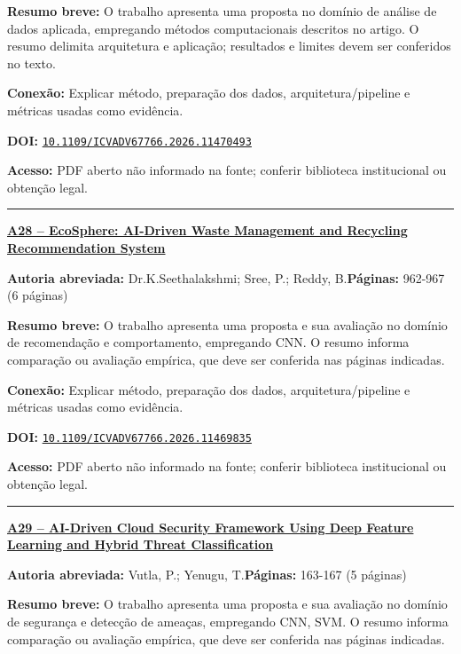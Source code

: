\documentclass[10pt,a4paper]{article}
\begin{document}
\textbf{Resumo breve:} O trabalho apresenta uma proposta no domínio de análise de dados aplicada, empregando métodos computacionais descritos no artigo. O resumo delimita arquitetura e aplicação; resultados e limites devem ser conferidos no texto.\par
\textbf{Conexão:} Explicar método, preparação dos dados, arquitetura/pipeline e métricas usadas como evidência.\par
\textbf{DOI:} \href{https://doi.org/10.1109/ICVADV67766.2026.11470493}{\nolinkurl{10.1109/ICVADV67766.2026.11470493}}\par
\textbf{Acesso:} PDF aberto não informado na fonte; conferir biblioteca institucional ou obtenção legal.\par
\noindent\rule{\textwidth}{0.35pt}
\par\medskip\noindent
{\large\bfseries\href{https://doi.org/10.1109/ICVADV67766.2026.11469835}{A28 -- EcoSphere: AI-Driven Waste Management and Recycling Recommendation System}}\par\smallskip
\textbf{Autoria abreviada:} Dr.K.Seethalakshmi; Sree, P.; Reddy, B.\quad \textbf{Páginas:} 962-967 (6 páginas)\par
\textbf{Resumo breve:} O trabalho apresenta uma proposta e sua avaliação no domínio de recomendação e comportamento, empregando CNN. O resumo informa comparação ou avaliação empírica, que deve ser conferida nas páginas indicadas.\par
\textbf{Conexão:} Explicar método, preparação dos dados, arquitetura/pipeline e métricas usadas como evidência.\par
\textbf{DOI:} \href{https://doi.org/10.1109/ICVADV67766.2026.11469835}{\nolinkurl{10.1109/ICVADV67766.2026.11469835}}\par
\textbf{Acesso:} PDF aberto não informado na fonte; conferir biblioteca institucional ou obtenção legal.\par
\noindent\rule{\textwidth}{0.35pt}
\par\medskip\noindent
{\large\bfseries\href{https://doi.org/10.1109/ICVADV67766.2026.11469856}{A29 -- AI-Driven Cloud Security Framework Using Deep Feature Learning and Hybrid Threat Classification}}\par\smallskip
\textbf{Autoria abreviada:} Vutla, P.; Yenugu, T.\quad \textbf{Páginas:} 163-167 (5 páginas)\par
\textbf{Resumo breve:} O trabalho apresenta uma proposta e sua avaliação no domínio de segurança e detecção de ameaças, empregando CNN, SVM. O resumo informa comparação ou avaliação empírica, que deve ser conferida nas páginas indicadas.\par
\end{document}

